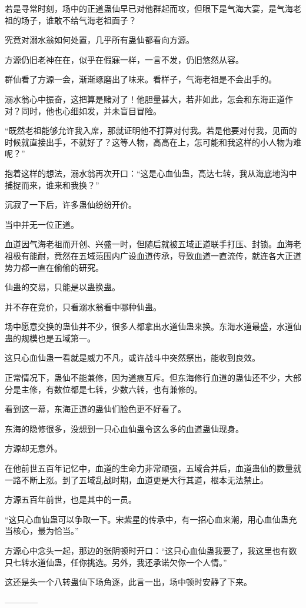 \begin{this_body}
若是寻常时刻，场中的正道蛊仙早已对他群起而攻，但眼下是气海大宴，是气海老祖的场子，谁敢不给气海老祖面子？

究竟对溺水翁如何处置，几乎所有蛊仙都看向方源。

方源仍旧老神在在，似乎在假寐一样，一言不发，仍旧悠然从容。

群仙看了方源一会，渐渐琢磨出了味来。看样子，气海老祖是不会出手的。

溺水翁心中振奋，这把算是赌对了！他胆量甚大，若非如此，怎会和东海正道作对？同时，他也心细如发，并未盲目冒险。

“既然老祖能够允许我入席，那就证明他不打算对付我。若是他要对付我，见面的时候就直接出手，不就好了？这等人物，高高在上，怎可能和我这样的小人物为难呢？”

抱着这样的想法，溺水翁再次开口：“这是心血仙蛊，高达七转，我从海底地沟中捕捉而来，谁来和我换？”

沉寂了一下后，许多蛊仙纷纷开价。

当中并无一位正道。

血道因气海老祖而开创、兴盛一时，但随后就被五域正道联手打压、封锁。血海老祖极有能耐，竟然在五域范围内广设血道传承，导致血道一直流传，就连各大正道势力都一直在偷偷的研究。

仙蛊的交易，只能是以蛊换蛊。

并不存在竞价，只看溺水翁看中哪种仙蛊。

场中愿意交换的蛊仙并不少，很多人都拿出水道仙蛊来换。东海水道最盛，水道仙蛊的规模也是五域第一。

这只心血仙蛊一看就是威力不凡，或许战斗中突然祭出，能收到良效。

正常情况下，蛊仙不能兼修，因为道痕互斥。但东海修行血道的蛊仙还不少，大部分是主修，有数位都是七转，少数六转，也有兼修的。

看到这一幕，东海正道的蛊仙们脸色更不好看了。

东海的隐修很多，没想到一只心血仙蛊令这么多的血道蛊仙现身。

方源却无意外。

在他前世五百年记忆中，血道的生命力非常顽强，五域合并后，血道蛊仙的数量就一路不断上涨。到了五域乱战时期，血道更是大行其道，根本无法禁止。

方源五百年前世，也是其中的一员。

“这只心血仙蛊可以争取一下。宋紫星的传承中，有一招心血来潮，用心血仙蛊充当核心，最为恰当。”

方源心中念头一起，那边的张阴顿时开口：“这只心血仙蛊我要了，我这里也有数只七转水道仙蛊，任你挑选。另外，我还承诺欠你一个人情。”

这还是头一个八转蛊仙下场角逐，此言一出，场中顿时安静了下来。

------------

\end{this_body}

